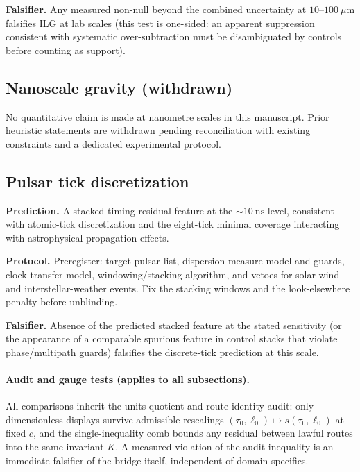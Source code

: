 \documentclass[11pt]{article}
\begin{document}
\textbf{Falsifier.} Any measured non-null beyond the combined uncertainty at \(10\text{--}100~\mu\mathrm{m}\) falsifies ILG at lab scales (this test is one-sided: an apparent suppression consistent with systematic over-subtraction must be disambiguated by controls before counting as support).

\subsection{Nanoscale gravity (withdrawn)}\label{subsec:pred-nano}
No quantitative claim is made at nanometre scales in this manuscript. Prior heuristic statements are withdrawn pending reconciliation with existing constraints and a dedicated experimental protocol.

\subsection{Pulsar tick discretization}\label{subsec:pred-pulsars}
\textbf{Prediction.} A stacked timing-residual feature at the \(\sim 10~\mathrm{ns}\) level, consistent with atomic-tick discretization and the eight-tick minimal coverage interacting with astrophysical propagation effects.

\textbf{Protocol.} Preregister: target pulsar list, dispersion-measure model and guards, clock-transfer model, windowing/stacking algorithm, and vetoes for solar-wind and interstellar-weather events. Fix the stacking windows and the look-elsewhere penalty before unblinding.%

\textbf{Falsifier.} Absence of the predicted stacked feature at the stated sensitivity (or the appearance of a comparable spurious feature in control stacks that violate phase/multipath guards) falsifies the discrete-tick prediction at this scale.

\paragraph{Audit and gauge tests (applies to all subsections).} All comparisons inherit the units-quotient and route-identity audit: only dimensionless displays survive admissible rescalings \((\tau_0,\ell_0)\mapsto s(\tau_0,\ell_0)\) at fixed \(c\), and the single-inequality comb bounds any residual between lawful routes into the same invariant \(K\). A measured violation of the audit inequality is an immediate falsifier of the bridge itself, independent of domain specifics.%
\end{document}
